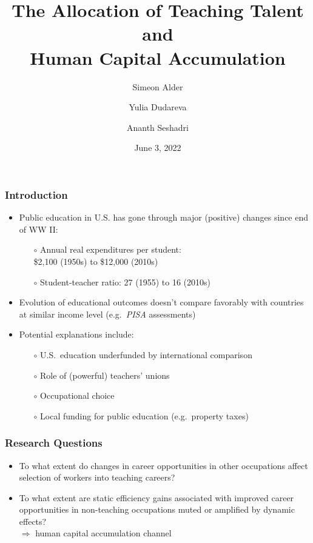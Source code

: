 \documentclass[11pt]{beamer}
\title{The Allocation of Teaching Talent and \\Human Capital Accumulation}
\author[shortname]{Simeon Alder\inst{1} \and Yulia Dudareva\inst{1} \and Ananth Seshadri\inst{1}}
\institute[shortinst]{\inst{1} University of Wisconsin--Madison}
\date{June 3, 2022}
\begin{document}
	
	\begin{frame}
		\titlepage
	\end{frame}
	
	\begin{frame}
		\frametitle{Introduction}
		\vfill
		\begin{itemize}
			\item Public education in U.S. has gone through major (positive) changes since end of WW II:
			\begin{itemize}
				\item[$\circ$] Annual real expenditures per student: \\
				\$2,100 (1950s) to \$12,000 (2010s)
				\item[$\circ$] Student-teacher ratio: 27 (1955) to 16 (2010s)
			\end{itemize}
			\vfill
			\item Evolution of educational outcomes doesn't compare favorably with countries at similar income level (e.g.~{\it PISA} assessments)
			\vfill
			\item Potential explanations include:
			\begin{itemize}
				\item[$\circ$] U.S.~education underfunded by international comparison
				\item[$\circ$] Role of (powerful) teachers' unions \pause
				\item[$\circ$] \alert{Occupational choice} \pause
				\item[$\circ$] Local funding for public education (e.g.~property taxes)
			\end{itemize}
		\end{itemize}
		\vfill
	\end{frame}
	
	\begin{frame}
		\frametitle{Research Questions}
		\vfill
		\begin{itemize}
			\item To what extent do changes in career opportunities in other occupations affect selection of workers into teaching careers?
			\vfill
			\item To what extent are static efficiency gains associated with improved career opportunities in non-teaching occupations muted or amplified by dynamic effects?\\
			$\Rightarrow$ human capital accumulation channel
		\end{itemize}
		\vfill
	\end{frame}
	
\end{document}
